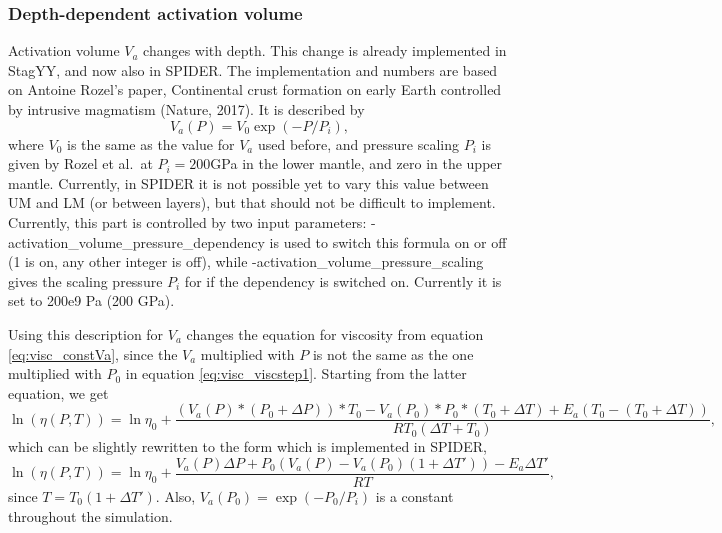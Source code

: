 \subsubsection{Depth-dependent activation volume}
Activation volume $V_a$ changes with depth. This change is already implemented in StagYY, and now also in SPIDER. The implementation and numbers are based on Antoine Rozel's paper, Continental crust formation on early Earth controlled by intrusive magmatism (Nature, 2017). It is described by
\begin{equation}
V_a(P) = V_0 \exp(- P/P_i),
\end{equation}
where $V_0$ is the same as the value for $V_a$ used before, and pressure scaling $P_i$ is given by Rozel et al.\ at $P_i=200$GPa in the lower mantle, and zero in the upper mantle. Currently, in SPIDER it is not possible yet to vary this value between UM and LM (or between layers), but that should not be difficult to implement. Currently, this part is controlled by two input parameters: -activation\_volume\_pressure\_dependency is used to switch this formula on or off (1 is on, any other integer is off), while -activation\_volume\_pressure\_scaling gives the scaling pressure $P_i$ for if the dependency is switched on. Currently it is set to 200e9 Pa (200 GPa).


Using this description for $V_a$ changes the equation for viscosity from equation \ref{eq:visc_constVa}, since the $V_a$ multiplied with $P$ is not the same as the one multiplied with $P_0$ in equation \ref{eq:visc_viscstep1}. Starting from the latter equation, we get
\begin{equation*}
\ln ( \eta (P,T)) = \ln \eta_0 + \frac{( V_a(P)*(P_0 + \Delta P))*T_0 -  V_a(P_0)*P_0*(T_0 + \Delta T) + E_a (T_0 - (T_0 + \Delta T))}{R T_0 (\Delta T + T_0)},
\end{equation*}
which can be slightly rewritten to the form which is implemented in SPIDER,
\begin{equation}
\ln ( \eta (P,T)) = \ln \eta_0 + \frac{V_a(P) \Delta P + P_0 \left( V_a(P) - V_a(P_0) (1 + \Delta T' ) \right) - E_a \Delta T' }{R T},
\label{eq:visc_varVa}
\end{equation}
since $T = T_0(1 + \Delta T' )$. Also, $V_a(P_0) =\exp(-P_0/P_i)$ is a constant throughout the simulation.


